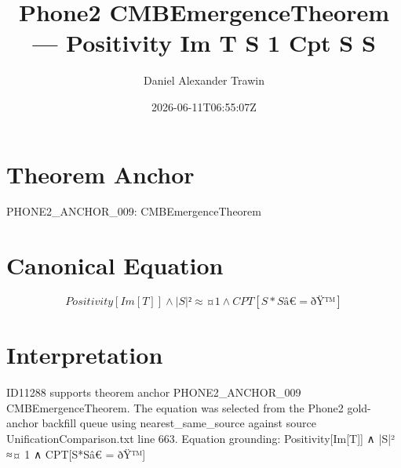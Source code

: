\documentclass[11pt]{article}
\title{Phone2 CMBEmergenceTheorem — Positivity Im T S 1 Cpt S S}
\author{Daniel Alexander Trawin}
\date{2026-06-11T06:55:07Z}
\begin{document}
\maketitle
\section*{Theorem Anchor}
PHONE2_ANCHOR_009: CMBEmergenceTheorem
\section*{Canonical Equation}
\[
Positivity[Im[T]] ∧ |S|² ≈¤ 1 ∧ CPT[S*Sâ€ = ðŸ™]
\]
\section*{Interpretation}
ID11288 supports theorem anchor PHONE2_ANCHOR_009 CMBEmergenceTheorem. The equation was selected from the Phone2 gold-anchor backfill queue using nearest_same_source against source UnificationComparison.txt line 663. Equation grounding: Positivity[Im[T]] ∧ |S|² ≈¤ 1 ∧ CPT[S*Sâ€ = ðŸ™]
\end{document}
